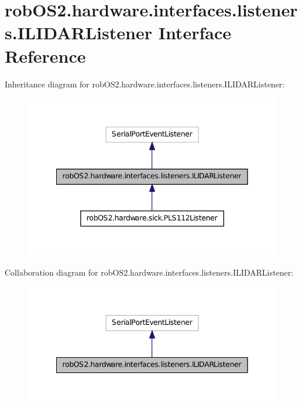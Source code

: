 \hypertarget{interfacerob_o_s2_1_1hardware_1_1interfaces_1_1listeners_1_1_i_l_i_d_a_r_listener}{
\section{robOS2.hardware.interfaces.listeners.ILIDARListener Interface Reference}
\label{interfacerob_o_s2_1_1hardware_1_1interfaces_1_1listeners_1_1_i_l_i_d_a_r_listener}
}


Inheritance diagram for robOS2.hardware.interfaces.listeners.ILIDARListener:\nopagebreak
\begin{figure}[H]
\begin{center}
\leavevmode
\includegraphics[width=344pt]{interfacerob_o_s2_1_1hardware_1_1interfaces_1_1listeners_1_1_i_l_i_d_a_r_listener__inherit__graph}
\end{center}
\end{figure}


Collaboration diagram for robOS2.hardware.interfaces.listeners.ILIDARListener:\nopagebreak
\begin{figure}[H]
\begin{center}
\leavevmode
\includegraphics[width=344pt]{interfacerob_o_s2_1_1hardware_1_1interfaces_1_1listeners_1_1_i_l_i_d_a_r_listener__coll__graph}
\end{center}
\end{figure}
